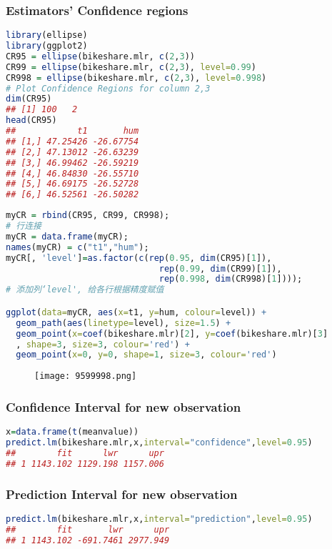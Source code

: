 \documentclass[11pt,a4paper]{article}
\begin{document}
\subsubsection{Estimators' Confidence regions}
\begin{lstlisting}[language=R]
library(ellipse)
library(ggplot2)
CR95 = ellipse(bikeshare.mlr, c(2,3))
CR99 = ellipse(bikeshare.mlr, c(2,3), level=0.99)
CR998 = ellipse(bikeshare.mlr, c(2,3), level=0.998)
# Plot Confidence Regions for column 2,3
dim(CR95)
## [1] 100   2
head(CR95)
##            t1       hum
## [1,] 47.25426 -26.67754
## [2,] 47.13012 -26.63239
## [3,] 46.99462 -26.59219
## [4,] 46.84830 -26.55710
## [5,] 46.69175 -26.52728
## [6,] 46.52561 -26.50282
\end{lstlisting}
\begin{lstlisting}[language=R]
myCR = rbind(CR95, CR99, CR998);
# 行连接
myCR = data.frame(myCR); 
names(myCR) = c("t1","hum"); 
myCR[, 'level']=as.factor(c(rep(0.95, dim(CR95)[1]), 
                              rep(0.99, dim(CR99)[1]), 
                              rep(0.998, dim(CR998)[1])));
# 添加列‘level', 给各行根据精度赋值

ggplot(data=myCR, aes(x=t1, y=hum, colour=level)) + 
  geom_path(aes(linetype=level), size=1.5) + 
  geom_point(x=coef(bikeshare.mlr)[2], y=coef(bikeshare.mlr)[3]
  , shape=3, size=3, colour='red') + 
  geom_point(x=0, y=0, shape=1, size=3, colour='red') 
\end{lstlisting}
\begin{center}\begin{figure}[htbp]
    \centering
    \texttt{[image: 9599998.png]}
    \caption{}
    \label{}
\end{figure}\end{center}

\subsubsection{Confidence Interval for new observation}
\begin{lstlisting}[language=R]
x=data.frame(t(meanvalue))
predict.lm(bikeshare.mlr,x,interval="confidence",level=0.95)
##        fit      lwr      upr
## 1 1143.102 1129.198 1157.006
\end{lstlisting}
\subsubsection{Prediction Interval for new observation}
\begin{lstlisting}[language=R]
predict.lm(bikeshare.mlr,x,interval="prediction",level=0.95)
##        fit       lwr      upr
## 1 1143.102 -691.7461 2977.949
\end{lstlisting}
\end{document}
